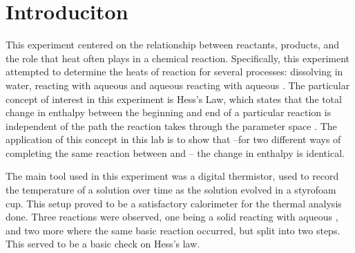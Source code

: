\section{Introduciton}

This experiment centered on the relationship between reactants, products,
and the role that heat often plays in a chemical reaction.
Specifically, this experiment attempted to determine the heats of reaction for several processes:
\koh dissolving in water,
\koh reacting with aqueous \hcl
and aqueous \koh reacting with aqueous \hcl.
The particular concept of interest in this experiment is Hess's Law,
which states that the total change in enthalpy between the beginning and end of a particular reaction is
independent of the path the reaction takes through the parameter space \cite{hess2019}. 
The application of this concept in this lab is to show that
--for two different ways of completing the same reaction between \koh and --
the change in enthalpy is identical. 

The main tool used in this experiment was a digital thermistor,
used to record the temperature of a solution over time as the solution evolved in a styrofoam cup.
This setup proved to be a satisfactory calorimeter for the thermal analysis done. Three reactions were observed,
one being a solid \koh reacting with aqueous \hcl, and two more where the same basic reaction occurred, but split into two steps.
This served to be a basic check on Hess's law.


